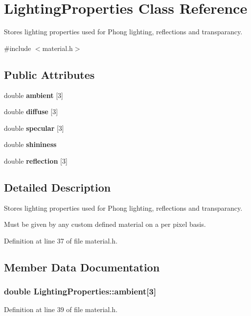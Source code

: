 \section{Lighting\+Properties Class Reference}
\label{class_lighting_properties}


Stores lighting properties used for Phong lighting, reflections and transparancy.  




{\ttfamily \#include $<$material.\+h$>$}

\subsection*{Public Attributes}
\begin{DoxyCompactItemize}
\item 
double {\bf ambient} [3]
\item 
double {\bf diffuse} [3]
\item 
double {\bf specular} [3]
\item 
double {\bf shininess}
\item 
double {\bf reflection} [3]
\end{DoxyCompactItemize}


\subsection{Detailed Description}
Stores lighting properties used for Phong lighting, reflections and transparancy. 

Must be given by any custom defined material on a per pixel basis. 

Definition at line 37 of file material.\+h.



\subsection{Member Data Documentation}
\subsubsection[{ambient}]{\setlength{\rightskip}{0pt plus 5cm}double Lighting\+Properties\+::ambient[3]}\label{class_lighting_properties_a10acb0d655b119de855389ec9840ca8e}


Definition at line 39 of file material.\+h.



